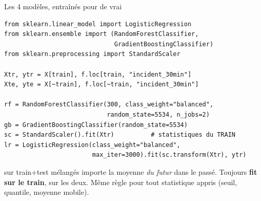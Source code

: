 \begin{frame}[fragile]{Les 4 modèles, entraînés pour de vrai}
\begin{codebox}
\begin{lstlisting}
from sklearn.linear_model import LogisticRegression
from sklearn.ensemble import (RandomForestClassifier,
                              GradientBoostingClassifier)
from sklearn.preprocessing import StandardScaler

Xtr, ytr = X[train], f.loc[train, "incident_30min"]
Xte, yte = X[~train], f.loc[~train, "incident_30min"]

rf = RandomForestClassifier(300, class_weight="balanced",
                            random_state=5534, n_jobs=2)
gb = GradientBoostingClassifier(random_state=5534)
sc = StandardScaler().fit(Xtr)          # statistiques du TRAIN
lr = LogisticRegression(class_weight="balanced",
                        max_iter=3000).fit(sc.transform(Xtr), ytr)
\end{lstlisting}
\end{codebox}
\begin{wbox}
 sur train+test mélangés importe la
moyenne \emph{du futur} dans le passé. Toujours \textbf{fit sur
le train},  sur les deux. Même règle pour tout
statistique appris (seuil, quantile, moyenne mobile).
\end{wbox}
\end{frame}

